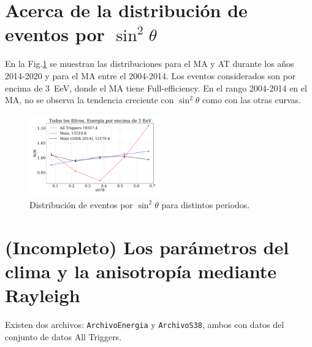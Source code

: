 \section*{Acerca de la distribución de eventos por $\sin^2\theta$}

En la Fig.\ref{fig:distri} se muestran las distribuciones  para el MA y AT durante los años 2014-2020 y para el MA  entre el 2004-2014. Los eventos considerados son por encima de $3\,$ EeV, donde el MA tiene Full-efficiency.  En el rango 2004-2014 en el MA, no se observa la tendencia creciente con $\sin^2\theta$ como con las otras curvas.

\begin{figure}[H]
    \begin{small}
        \begin{center}
            \includegraphics[width=0.5\textwidth]{eventos_bin_sin_theta.pdf}
        \end{center}
        \caption{Distribución de eventos por $\sin^2\theta$ para distintos periodos. }
        \label{fig:distri}
    \end{small}
\end{figure}

\section*{(Incompleto) Los parámetros del clima y la anisotropía mediante Rayleigh}

Existen dos archivos: \verb|ArchivoEnergia|  y \verb|ArchivoS38|, ambos con datos del conjunto de datos All Triggers.

